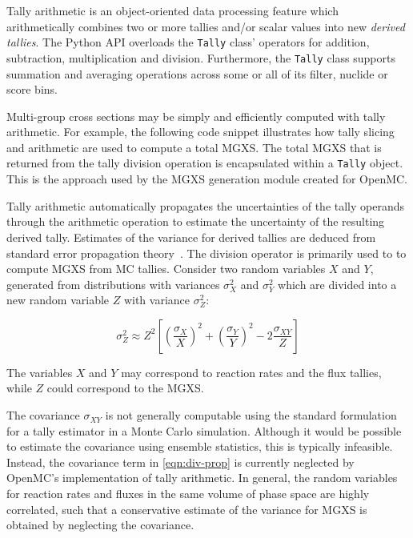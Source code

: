 Tally arithmetic is an object-oriented data processing feature which arithmetically combines two or more tallies and/or scalar values into new \emph{derived tallies}. The Python API overloads the \texttt{Tally} class' operators for addition, subtraction, multiplication and division. Furthermore, the \texttt{Tally} class supports summation and averaging operations across some or all of its filter, nuclide or score bins.

Multi-group cross sections may be simply and efficiently computed with tally arithmetic. For example, the following code snippet illustrates how tally slicing and arithmetic are used to compute a total MGXS. The total MGXS that is returned from the tally division operation is encapsulated within a \texttt{Tally} object. This is the approach used by the MGXS generation module created for OpenMC.



Tally arithmetic automatically propagates the uncertainties of the tally operands through the arithmetic operation to estimate the uncertainty of the resulting derived tally. Estimates of the variance for derived tallies are deduced from standard error propagation theory~\cite{bevington2003data}. The division operator is primarily used to to compute MGXS from MC tallies. Consider two random variables $X$ and $Y$, generated from distributions with variances $\sigma_{X}^2$ and $\sigma_{Y}^2$ which are divided into a new random variable $Z$ with variance $\sigma_{Z}^2$:

\begin{equation}
\label{eqn:div-prop}
\sigma_{Z}^{2} \approx Z^{2}\left[\left(\frac{\sigma_{X}}{X}\right)^{2} + \left(\frac{\sigma_{Y}}{Y}\right)^{2} - 2\frac{\sigma_{XY}}{Z}\right]
\end{equation}

\noindent The variables $X$ and $Y$ may correspond to reaction rates and the flux tallies, while $Z$ could correspond to the MGXS.

The covariance $\sigma_{XY}$ is not generally computable using the standard formulation for a tally estimator in a Monte Carlo simulation. Although it would be possible to estimate the covariance using ensemble statistics, this is typically infeasible. Instead, the covariance term in \cref{eqn:div-prop} is currently neglected by OpenMC's implementation of tally arithmetic. In general, the random variables for reaction rates and fluxes in the same volume of phase space are highly correlated, such that a conservative estimate of the variance for MGXS is obtained by neglecting the covariance.

